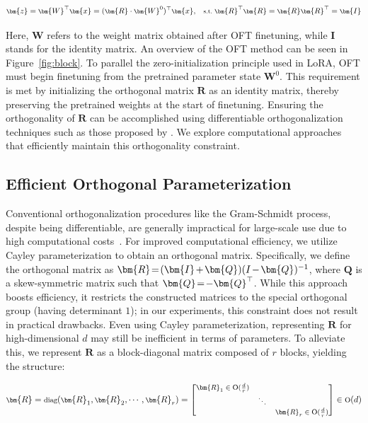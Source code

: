 \begin{equation}\label{eq:oft_general}
    \footnotesize
    \bm{z} = \bm{W}^\top\bm{x} = (\bm{R}\cdot\bm{W}^0)^\top\bm{x},~~~\text{s.t.}~\bm{R}^\top\bm{R} = \bm{R}\bm{R}^\top = \bm{I}
\end{equation}

Here, $\bm{W}$ refers to the weight matrix obtained after OFT finetuning, while $\bm{I}$ stands for the identity matrix. An overview of the OFT method can be seen in Figure~\ref{fig:block}. To parallel the zero-initialization principle used in LoRA, OFT must begin finetuning from the pretrained parameter state $\bm{W}^0$. This requirement is met by initializing the orthogonal matrix $\bm{R}$ as an identity matrix, thereby preserving the pretrained weights at the start of finetuning. Ensuring the orthogonality of $\bm{R}$ can be accomplished using differentiable orthogonalization techniques such as those proposed by \cite{liu2021orthogonal,lezcano2019cheap}. We explore computational approaches that efficiently maintain this orthogonality constraint.

\subsection{Efficient Orthogonal Parameterization}\label{sect:eff_ortho}

Conventional orthogonalization procedures like the Gram-Schmidt process, despite being differentiable, are generally impractical for large-scale use due to high computational costs~\cite{liu2021orthogonal}. For improved computational efficiency, we utilize Cayley parameterization to obtain an orthogonal matrix. Specifically, we define the orthogonal matrix as $\thickmuskip=2mu \medmuskip=2mu \bm{R}=(\bm{I}+\bm{Q})(I-\bm{Q})^{-1}$, where $\bm{Q}$ is a skew-symmetric matrix such that $\thickmuskip=2mu \medmuskip=2mu \bm{Q}=-\bm{Q}^\top$. While this approach boosts efficiency, it restricts the constructed matrices to the special orthogonal group (having determinant $1$); in our experiments, this constraint does not result in practical drawbacks. Even using Cayley parameterization, representing $\bm{R}$ for high-dimensional $d$ may still be inefficient in terms of parameters. To alleviate this, we represent $\bm{R}$ as a block-diagonal matrix composed of $r$ blocks, yielding the structure:

\begin{equation}
    \footnotesize
    \bm{R} = \text{diag}(\bm{R}_1,\bm{R}_2,\cdots,\bm{R}_r) = \begin{bmatrix}
    \bm{R}_1\in \text{O}(\frac{d}{r}) &  &\\
    &\ddots & \\
    & & \bm{R}_r\in \text{O}(\frac{d}{r})
    \end{bmatrix}\in \text{O}(d)
\end{equation}

